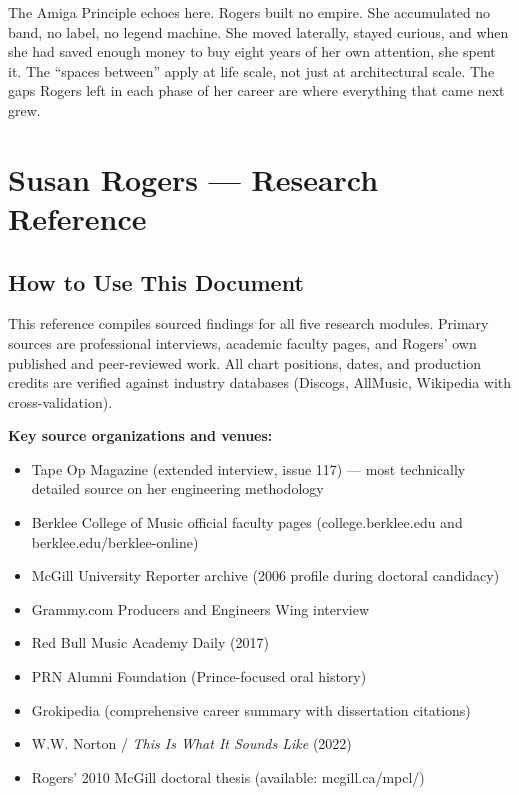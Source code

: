 \documentclass[11pt,letterpaper]{article}
\newcommand{\stageheader}[2]{%
  \noindent\colorbox{#2}{\makebox[\textwidth][l]{%
    \textcolor{white}{\bfseries\sffamily\hspace{6pt}#1\hspace{6pt}}}}%
  \vspace{0.5em}\par%
}
\begin{document}
The Amiga Principle echoes here. Rogers built no empire. She accumulated no band, no label, no legend machine. She moved laterally, stayed curious, and when she had saved enough money to buy eight years of her own attention, she spent it. The ``spaces between'' apply at life scale, not just at architectural scale. The gaps Rogers left in each phase of her career are where everything that came next grew.

\newpage

\stageheader{STAGE 2 --- RESEARCH REFERENCE}{secondary}

\section{Susan Rogers --- Research Reference}

\subsection{How to Use This Document}

This reference compiles sourced findings for all five research modules. Primary sources are professional interviews, academic faculty pages, and Rogers' own published and peer-reviewed work. All chart positions, dates, and production credits are verified against industry databases (Discogs, AllMusic, Wikipedia with cross-validation).

\textbf{Key source organizations and venues:}
\begin{itemize}[leftmargin=2em]
  \item Tape Op Magazine (extended interview, issue 117) --- most technically detailed source on her engineering methodology
  \item Berklee College of Music official faculty pages (college.berklee.edu and berklee.edu/berklee-online)
  \item McGill University Reporter archive (2006 profile during doctoral candidacy)
  \item Grammy.com Producers and Engineers Wing interview
  \item Red Bull Music Academy Daily (2017)
  \item PRN Alumni Foundation (Prince-focused oral history)
  \item Grokipedia (comprehensive career summary with dissertation citations)
  \item W.W. Norton / \textit{This Is What It Sounds Like} (2022)
  \item Rogers' 2010 McGill doctoral thesis (available: mcgill.ca/mpcl/)
\end{itemize}
\end{document}
